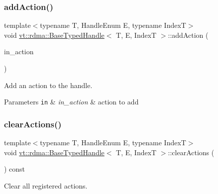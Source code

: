 \subsubsection{\texorpdfstring{add\+Action()}{addAction()}}
{\footnotesize\ttfamily template$<$typename T, Handle\+Enum E, typename IndexT$>$ \\
void \hyperlink{structvt_1_1rdma_1_1_base_typed_handle}{vt\+::rdma\+::\+Base\+Typed\+Handle}$<$ T, E, IndexT $>$\+::add\+Action (\begin{DoxyParamCaption}\item[{\hyperlink{structvt_1_1rdma_1_1_base_typed_handle_a20c231fb671a38c3bb761d613dd42b3c}{Action\+Data\+Type}}]{in\+\_\+action }\end{DoxyParamCaption})\hspace{0.3cm}{\ttfamily [inline]}}



Add an action to the handle. 


\begin{DoxyParams}[1]{Parameters}
\mbox{\tt in}  & {\em in\+\_\+action} & action to add \\
\hline
\end{DoxyParams}
\mbox{\label{structvt_1_1rdma_1_1_base_typed_handle_a48b8d5baf7532ee63c078d55ee90d6fe}} 
\subsubsection{\texorpdfstring{clear\+Actions()}{clearActions()}}
{\footnotesize\ttfamily template$<$typename T, Handle\+Enum E, typename IndexT$>$ \\
void \hyperlink{structvt_1_1rdma_1_1_base_typed_handle}{vt\+::rdma\+::\+Base\+Typed\+Handle}$<$ T, E, IndexT $>$\+::clear\+Actions (\begin{DoxyParamCaption}{ }\end{DoxyParamCaption}) const\hspace{0.3cm}{\ttfamily [inline]}}



Clear all registered actions. 

\mbox{\label{structvt_1_1rdma_1_1_base_typed_handle_a1e7937b5cf4b641a783c37675ae2cc35}} 
